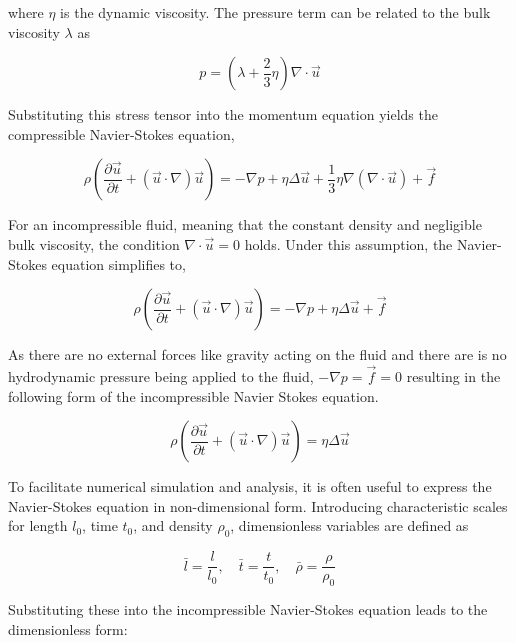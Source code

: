 where $\eta$ is the dynamic viscosity. The pressure term can be related to the bulk viscosity $\lambda$ as

\begin{equation}
    p = \left( \lambda + \frac{2}{3}\eta \right) \nabla \cdot \vec{u}
\end{equation}

Substituting this stress tensor into the momentum equation yields the compressible Navier-Stokes equation,

\begin{equation}
    \rho \left(\frac{\partial\vec{u}}{\partial t} + (\vec{u}\cdot\nabla)\vec{u} \right) = -\nabla p + \eta \Delta \vec{u} + \frac{1}{3}\eta \nabla(\nabla \cdot \vec{u}) + \vec{f}
\end{equation}

For an incompressible fluid, meaning that the constant density and negligible bulk viscosity, the condition $\nabla \cdot \vec{u} = 0$ holds. Under this 
assumption, the Navier-Stokes equation simplifies to,

\begin{equation}
    \rho \left(\frac{\partial\vec{u}}{\partial t} + (\vec{u}\cdot\nabla)\vec{u} \right) = -\nabla p + \eta \Delta \vec{u} + \vec{f}
\end{equation}

As there are no external forces like gravity acting on the fluid and there are is no hydrodynamic pressure being applied to the fluid, $-\nabla p = \vec{f} = 0$ resulting in the
following form of the incompressible Navier Stokes equation.

\begin{equation}
    \rho \left(\frac{\partial\vec{u}}{\partial t} + (\vec{u}\cdot\nabla)\vec{u} \right) = \eta \Delta \vec{u}
\end{equation}

To facilitate numerical simulation and analysis, it is often useful to express the Navier-Stokes equation in non-dimensional form. Introducing characteristic scales for length 
$l_0$, time $t_0$, and density $\rho_0$, dimensionless variables are defined as

\begin{equation}
    \bar{l} = \frac{l}{l_0}, \quad \bar{t} = \frac{t}{t_0}, \quad \bar{\rho} = \frac{\rho}{\rho_0}
\end{equation}

Substituting these into the incompressible Navier-Stokes equation leads to the dimensionless form:

